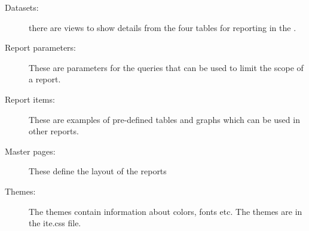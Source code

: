 \begin{description}
\item [Datasets:]{there are views to show details from the four tables for reporting in the \gddb{}.}
\item [Report parameters:]{These are parameters for the \gddb{} queries that can be used to limit the scope of a report.}
\item [Report items:]{These are examples of  pre-defined tables and graphs which can be used in other reports.}
\item [Master pages:]{These define the layout of the reports}
\item[Themes:]{The themes contain information about colors, fonts etc. The themes are in the ite.css file.}
\end{description}

 
